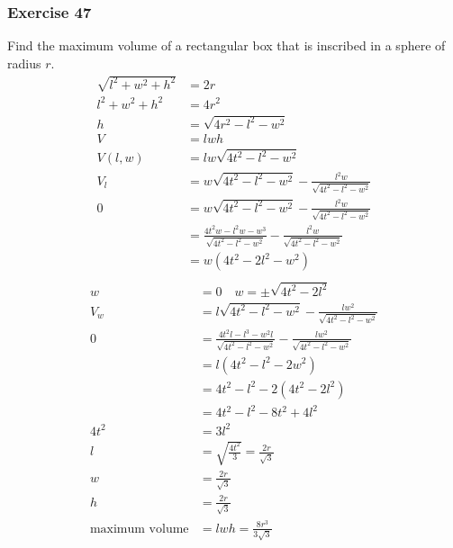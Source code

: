 \documentclass[letterpaper, 12pt]{math}
\begin{document}
\subsubsection*{Exercise 47}
Find the maximum volume of a rectangular box that is inscribed in a sphere of
radius \( r \).
\begin{align*}
  \sqrt{l^2+w^2+h^2} &= 2r \\
  l^2+w^2+h^2 &= 4r^2 \\
  h &= \sqrt{4r^2-l^2-w^2} \\
  V &= lwh \\
  V(l,w) &= lw\sqrt{4t^2-l^2-w^2} \\
  V_l &= w\sqrt{4t^2-l^2-w^2}-\frac{l^2w}{\sqrt{4t^2-l^2-w^2}} \\
  0 &= w\sqrt{4t^2-l^2-w^2}-\frac{l^2w}{\sqrt{4t^2-l^2-w^2}} \\
  &= \frac{4t^2w-l^2w-w^3}{\sqrt{4t^2-l^2-w^2}}-
    \frac{l^2w}{\sqrt{4t^2-l^2-w^2}} \\
  &= w(4t^2-2l^2-w^2) \\
\end{align*}
\begin{align*}
  w &= 0 \quad w = \pm\sqrt{4t^2-2l^2} \\
  V_w &= l\sqrt{4t^2-l^2-w^2}-\frac{lw^2}{\sqrt{4t^2-l^2-w^2}} \\
  0 &= \frac{4t^2l-l^3-w^2l}{\sqrt{4t^2-l^2-w^2}}
    -\frac{lw^2}{\sqrt{4t^2-l^2-w^2}} \\
  &= l(4t^2-l^2-2w^2) \\
  &= 4t^2-l^2-2(4t^2-2l^2) \\
  &= 4t^2-l^2-8t^2+4l^2 \\
  4t^2 &= 3l^2 \\
  l &= \sqrt{\frac{4t^2}{3}} = \frac{2r}{\sqrt{3}} \\
  w &= \frac{2r}{\sqrt{3}} \\
  h &= \frac{2r}{\sqrt{3}} \\
  \text{maximum volume} &= lwh = \frac{8r^3}{3\sqrt{3}}
\end{align*}
\end{document}

